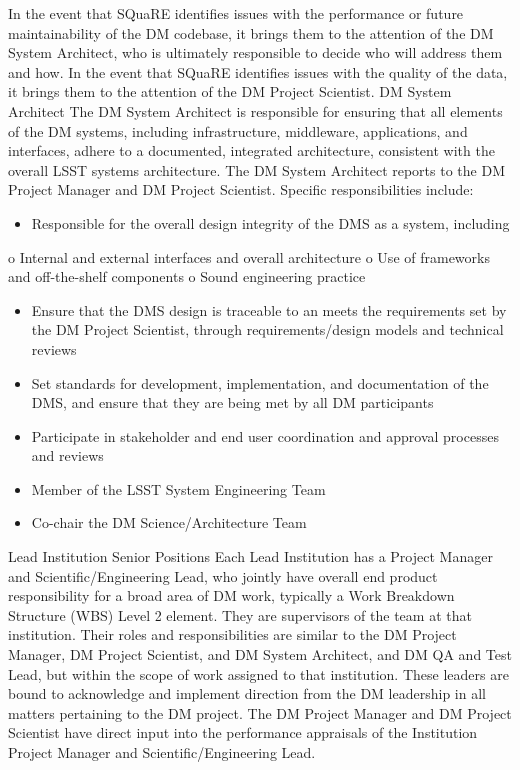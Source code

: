 \begin{itemize}
In the event that SQuaRE identifies issues with the performance or future maintainability of the DM codebase, it brings them to the attention of the DM System Architect, who is ultimately responsible to decide who will address them and how. In the event that SQuaRE identifies issues with the quality of the data, it brings them to the attention of the DM Project Scientist. 
DM System Architect
The DM System Architect is responsible for ensuring that all elements of the DM systems, including infrastructure, middleware, applications, and interfaces, adhere to a documented, integrated architecture, consistent with the overall LSST systems architecture.  The DM System Architect reports to the DM Project Manager and DM Project Scientist. Specific responsibilities include:
\begin{itemize}
\item Responsible for the overall design integrity of the DMS as a system, including
\end{itemize}
o Internal and external interfaces and overall architecture
o Use of frameworks and off-the-shelf components
o Sound engineering practice
\begin{itemize}
\item Ensure that the DMS design is traceable to an meets the requirements set by the DM Project Scientist, through requirements/design models and technical reviews
\item Set standards for development, implementation, and documentation of the DMS, and ensure that they are being met by all DM participants
\item Participate in stakeholder and end user coordination and approval processes and reviews
\item Member of the LSST System Engineering Team
\item Co-chair the DM Science/Architecture Team
\end{itemize}


Lead Institution Senior Positions
Each Lead Institution has a Project Manager and Scientific/Engineering Lead, who jointly have overall end product responsibility for a broad area of DM work, typically a Work Breakdown Structure (WBS) Level 2 element. They are supervisors of the team at that institution.  Their roles and responsibilities are similar to the DM Project Manager, DM Project Scientist, and DM System Architect, and DM QA and Test Lead, but within the scope of work assigned to that institution.  These leaders are bound to acknowledge and implement direction from the DM leadership in all matters pertaining to the DM project.  The DM Project Manager and DM Project Scientist have direct input into the performance appraisals of the Institution Project Manager and Scientific/Engineering Lead. 


\end{itemize}

